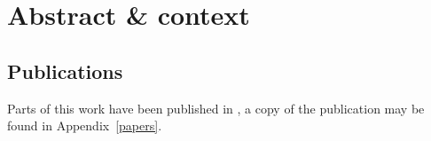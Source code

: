 \section*{Abstract \& context}

\subsection*{Publications}
Parts of this work have been published in \cite{mccluskey_pylj_2018}, a copy of the publication may be found in Appendix~\ref{papers}.
